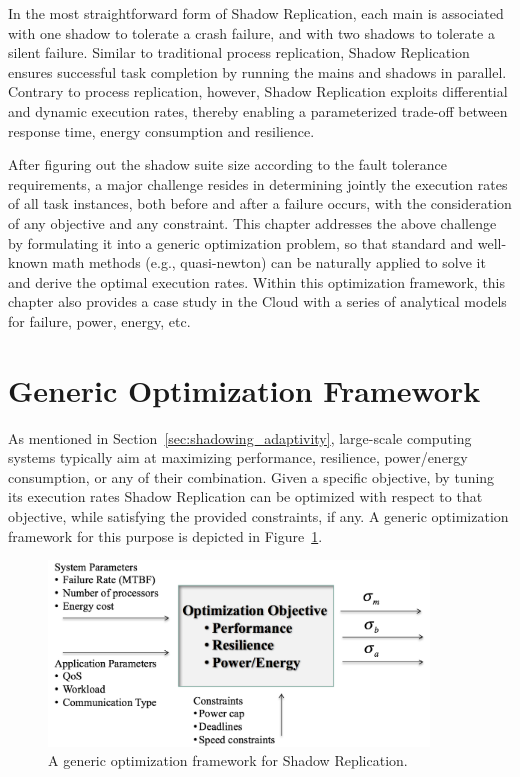 In the most straightforward form of Shadow Replication, each main is associated with one shadow to tolerate a crash failure, and with two shadows to tolerate a silent failure. 
Similar to traditional process replication, Shadow Replication ensures successful task
completion by running the mains and shadows in parallel. Contrary to process replication, however, Shadow Replication
exploits differential and dynamic execution rates, thereby enabling a
parameterized trade-off between response time, energy consumption and resilience.

After figuring out the shadow suite size according to the fault tolerance requirements, a major challenge resides in determining
jointly the execution rates of all task instances, both before and
after a failure occurs, with the consideration of any objective and any constraint. This chapter addresses the above challenge by formulating it into a generic optimization problem, so that standard and well-known math methods (e.g., quasi-newton) can be naturally applied to solve it and derive the optimal execution rates. Within this optimization framework, this chapter also provides a case study in the Cloud with a series of analytical models for failure, power, energy, etc. 

\section{Generic Optimization Framework}
As mentioned in Section~\ref{sec:shadowing_adaptivity}, large-scale computing systems typically aim at maximizing performance, resilience, power/energy consumption, or any of their combination. Given a specific objective, by tuning its execution rates Shadow Replication can be optimized with respect to that objective, while satisfying the provided constraints, if any. A generic optimization framework for this purpose is depicted in Figure~\ref{fig:opt_problem}.

\begin{figure}[t]
	\begin{center}
		\includegraphics[width=0.9\textwidth]{Figures/opt_problem}
	\end{center}
	\caption{A generic optimization framework for Shadow Replication.}
	\label{fig:opt_problem}
    \vskip -0.1in
\end{figure}

